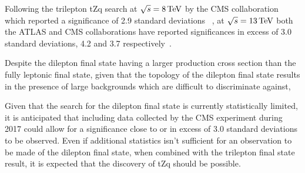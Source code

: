 Following the trilepton tZq search at $\sqrt{s} = 8 \,\text{Te\hspace{-.08em}V}$ by the CMS collaboration which reported a significance of 2.9 standard deviations ~\cite{Sirunyan:2017kkr}, at $\sqrt{s} = 13 \,\text{Te\hspace{-.08em}V}$ both the ATLAS and CMS collaborations  have reported significances in excess of 3.0 standard deviations, 4.2 and 3.7 respectively~\cite{Aaboud:2017ylb,Sirunyan:2017nbr}.

Despite the dilepton final state having a larger production cross section than the fully leptonic final state, given that the topology of the dilepton final state results in the presence of large backgrounds which are difficult to discriminate against, 

Given that the search for the dilepton final state is currently statistically limited, it is anticipated that including data collected by the CMS experiment during 2017 could allow for a significance close to or in excess of 3.0 standard deviations to be observed.
Even if additional statistics isn't sufficient for an observation to be made of the dilepton final state, when combined with the trilepton final state result, it is expected that the discovery of tZq should be possible.
